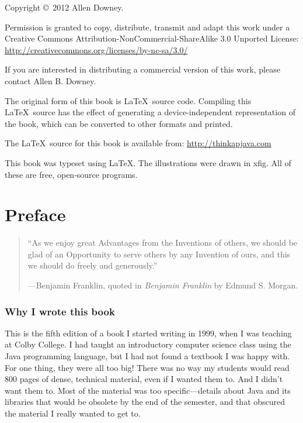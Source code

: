 \documentclass[12pt]{book}
\theoremstyle{exercise}
\begin{document}
\begin{latexonly}
Copyright \copyright ~2012 Allen Downey.

\vspace{0.25in}

Permission is granted to copy, distribute, transmit and adapt
this work under a Creative Commons
Attribution-NonCommercial-ShareAlike 3.0 Unported License:
\url{http://creativecommons.org/licenses/by-nc-sa/3.0/}

If you are interested in distributing a commercial version of this
work, please contact Allen B. Downey.

The original form of this book is \LaTeX\ source code.  Compiling this
\LaTeX\ source has the effect of generating a device-independent
representation of the book, which can be converted to other formats
and printed.

The \LaTeX\ source for this book is available from:
\url{http://thinkapjava.com}

This book was typeset using \LaTeX .  The illustrations were
drawn in xfig.  All of these are free, open-source programs.

\vspace{0.25in}



\end{latexonly}

\fi

\chapter{Preface}

\begin{quote}
``As we enjoy great Advantages from the Inventions of others,
we should be glad of an Opportunity to serve others by any
Invention of ours, and this we should do freely and generously.''

---Benjamin Franklin, quoted in {\em Benjamin Franklin} by
Edmund S. Morgan.
\end{quote}

\subsection*{Why I wrote this book}

This is the fifth edition of a book I started writing in 1999,
when I was teaching at Colby College.  I had taught an introductory
computer science class using the Java programming language, but I
had not found a textbook I was happy with.  For one thing,
they were all too big!  There was no way my students would read
800 pages of dense, technical material, even if I wanted them to.
And I didn't want them to.  Most of the material was too
specific---details about Java and its libraries that would be obsolete
by the end of the semester, and that obscured the material I really
wanted to get to.
\end{document}
